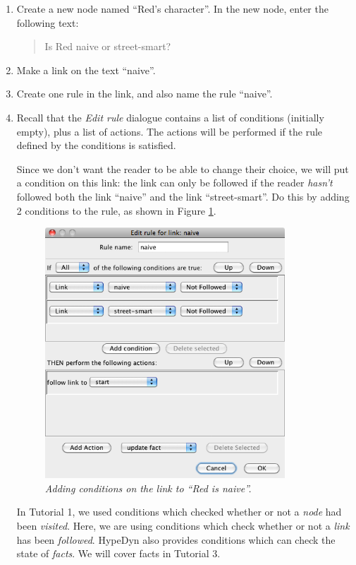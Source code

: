 \documentclass{article}
\begin{document}
\begin{enumerate}
  \item Create a new node named ``Red's character''. In the new node, enter the
following text:

\begin{quotation}
\noindent Is Red naive or street-smart?
\end{quotation}

\item Make a link on the text ``naive''.

\item Create one rule in the link, and also name the rule ``naive''.

\item Recall that the \textit{Edit rule} dialogue contains a list of conditions
(initially empty), plus a list of actions. The actions will be performed if the
rule defined by the conditions is satisfied.

Since we don't want the reader to be able to change their choice, we will put a
condition on this link: the link can only be followed if the reader
\textit{hasn't} followed both the link ``naive'' and the link ``street-smart''.
Do this by adding 2 conditions to the rule, as shown in Figure
\ref{fig:tut2:red_is_naive}.

\begin{figure}[h]
  \centering
  \includegraphics[width=9cm]{images/hypedyn-tutorial-2-figure-2}
  \caption{\textit{Adding conditions on the link to ``Red is naive''.}}
  \label{fig:tut2:red_is_naive}
\end{figure} 

\noindent In Tutorial 1, we used conditions which checked whether or not a
\textit{node} had been \textit{visited}. Here, we are using conditions which
check whether or not a \textit{link} has been \textit{followed}. HypeDyn also
provides conditions which can check the state of \textit{facts}. We will cover
facts in Tutorial 3.


\end{enumerate}
\end{document}
